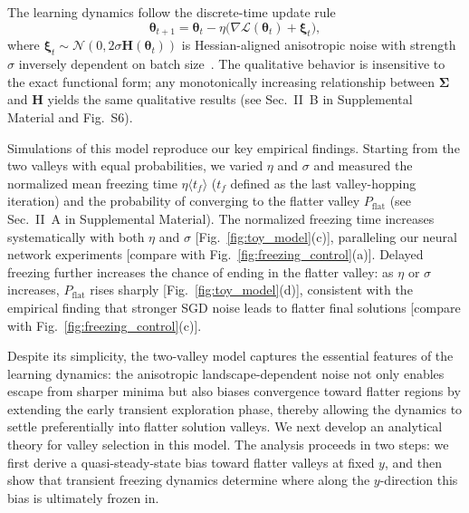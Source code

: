 \documentclass[aps,prx,reprint,superscriptaddress,longbibliography,nofootinbib,floatfix]{revtex4-2}
\begin{document}
The learning dynamics follow the discrete-time update rule
\begin{equation}
    \bm{\theta}_{t+1} = \bm{\theta}_t - \eta \bigl( \nabla \mathcal{L}(\bm{\theta}_t) + \bm{\xi}_t \bigr),
\label{eq:SGD_updating_rule}
\end{equation}
where $\bm{\xi}_t \sim \mathcal{N}(0, 2\sigma \mathbf{H}(\bm{\theta}_t))$ is Hessian-aligned anisotropic noise with strength $\sigma$ inversely dependent on batch size~\cite{fengInverseVarianceFlatness2021,zhuAnisotropicNoiseStochastic2019,xieDiffusionTheoryDeep2021,liHessianBasedAnalysis2020,yangStochasticGradientDescent2023}. The qualitative behavior is insensitive to the exact functional form; any monotonically increasing relationship between $\mathbf{\Sigma}$ and $\mathbf{H}$ yields the same qualitative results (see Sec.~II~B in Supplemental Material and Fig.~S6).


Simulations of this model reproduce our key empirical findings. Starting from the two valleys with equal probabilities, we varied $\eta$ and $\sigma$ and measured the normalized mean freezing time $\eta \langle t_f \rangle$ ($t_f$ defined as the last valley-hopping iteration) and the probability of converging to the flatter valley $P_{\mathrm{flat}}$ (see Sec.~II~A in Supplemental Material). The normalized freezing time increases systematically with both $\eta$ and $\sigma$ [Fig.~\ref{fig:toy_model}(c)], paralleling our neural network experiments [compare with Fig.~\ref{fig:freezing_control}(a)]. Delayed freezing further increases the chance of ending in the flatter valley: as $\eta$ or $\sigma$ increases, $P_{\mathrm{flat}}$ rises sharply [Fig.~\ref{fig:toy_model}(d)], consistent with the empirical finding that stronger SGD noise leads to flatter final solutions [compare with Fig.~\ref{fig:freezing_control}(c)].

Despite its simplicity, the two-valley model captures the essential features of the learning dynamics: the anisotropic landscape-dependent noise not only enables escape from sharper minima but also biases convergence toward flatter regions by extending the early transient exploration phase, thereby allowing the dynamics to settle preferentially into flatter solution valleys. We next develop an analytical theory for valley selection in this model. The analysis proceeds in two steps: we first derive a quasi-steady-state bias toward flatter valleys at fixed $y$, and then show that transient freezing dynamics determine where along the $y$-direction this bias is ultimately frozen in.
\end{document}
